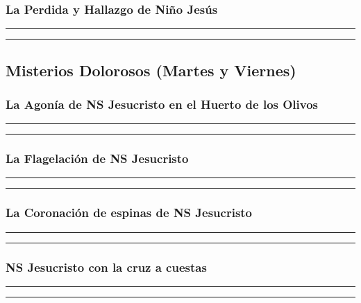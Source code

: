 \documentclass[11pt,a4paper]{report}
\begin{document}
    \subsubsection*{La Perdida y Hallazgo de Niño Jesús}
    
    
    \rule{\textwidth}{0.5pt}
    
    \rule{\textwidth}{0.5pt}
    

    \subsection*{Misterios Dolorosos (Martes y Viernes)}

    \subsubsection*{La Agonía de NS Jesucristo en el Huerto de los Olivos}
    
    
    \rule{\textwidth}{0.5pt}
    
    \rule{\textwidth}{0.5pt}
    

    \subsubsection*{La Flagelación de NS Jesucristo}
    
    
    \rule{\textwidth}{0.5pt}
    
    \rule{\textwidth}{0.5pt}
    

    \subsubsection*{La Coronación de espinas de NS Jesucristo}
    
    
    \rule{\textwidth}{0.5pt}
    
    \rule{\textwidth}{0.5pt}
    

    \subsubsection*{NS Jesucristo con la cruz a cuestas}
    
    
    \rule{\textwidth}{0.5pt}
    
    \rule{\textwidth}{0.5pt}
    
\end{document}
